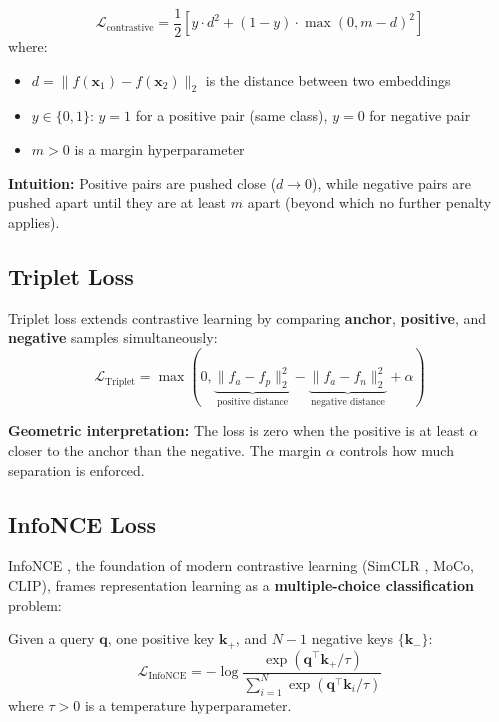 \begin{equation}
\mathcal{L}_{\text{contrastive}} = \frac{1}{2}\left[y \cdot d^2 + (1 - y) \cdot \max(0, m - d)^2\right]
\end{equation}
where:
\begin{itemize}
    \item $d = \|f(\mathbf{x}_1) - f(\mathbf{x}_2)\|_2$ is the distance between two embeddings
    \item $y \in \{0, 1\}$: $y = 1$ for a positive pair (same class), $y = 0$ for negative pair
    \item $m > 0$ is a margin hyperparameter
\end{itemize}

\textbf{Intuition:} Positive pairs are pushed close ($d \to 0$), while negative pairs are pushed apart until they are at least $m$ apart (beyond which no further penalty applies).

\subsection{Triplet Loss}

Triplet loss extends contrastive learning by comparing \textbf{anchor}, \textbf{positive}, and \textbf{negative} samples simultaneously:
\begin{equation}
\mathcal{L}_{\text{Triplet}} = \max\left(0, \underbrace{\|f_a - f_p\|_2^2}_{\text{positive distance}} - \underbrace{\|f_a - f_n\|_2^2}_{\text{negative distance}} + \alpha\right)
\end{equation}

\textbf{Geometric interpretation:} The loss is zero when the positive is at least $\alpha$ closer to the anchor than the negative. The margin $\alpha$ controls how much separation is enforced.

\subsection{InfoNCE Loss}

InfoNCE \cite{oord2018representation}, the foundation of modern contrastive learning (SimCLR \cite{chen2020simple}, MoCo, CLIP), frames representation learning as a \textbf{multiple-choice classification} problem:

\begin{definition}
Given a query $\mathbf{q}$, one positive key $\mathbf{k}_+$, and $N-1$ negative keys $\{\mathbf{k}_-\}$:
\begin{equation}
\mathcal{L}_{\text{InfoNCE}} = -\log \frac{\exp(\mathbf{q}^\top \mathbf{k}_+ / \tau)}{\sum_{i=1}^{N} \exp(\mathbf{q}^\top \mathbf{k}_i / \tau)}
\end{equation}
where $\tau > 0$ is a temperature hyperparameter.
\end{definition}

